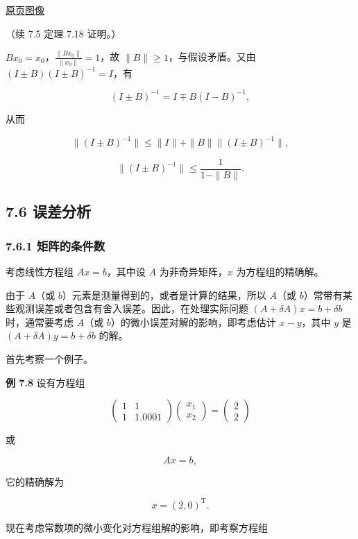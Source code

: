 \documentclass[
  10pt,
  fontset=fandol]{ctexart}
\begin{document}
\href{../../source-images/pdf-205.jpeg}{原页图像}

（续 7.5 定理 7.18 证明。）

\(Bx_0=x_0\)，\(\frac{\|Bx_0\|}{\|x_0\|}=1\)，故 \(\|B\|\geqslant1\)，与假设矛盾。又由 \((I\pm B)(I\pm B)^{-1}=I\)，有

\[
(I\pm B)^{-1}=I\mp B(I-B)^{-1},
\]

从而

\[
\|(I\pm B)^{-1}\|\leqslant\|I\|+\|B\|\|(I\pm B)^{-1}\|,
\]

\[
\|(I\pm B)^{-1}\|\leqslant\frac1{1-\|B\|}.
\]

\subsection{7.6 误差分析}\label{ux8befux5deeux5206ux6790}

\subsubsection{7.6.1 矩阵的条件数}\label{ux77e9ux9635ux7684ux6761ux4ef6ux6570}

考虑线性方程组 \(Ax=b\)，其中设 \(A\) 为非奇异矩阵，\(x\) 为方程组的精确解。

由于 \(A\)（或 \(b\)）元素是测量得到的，或者是计算的结果，所以 \(A\)（或 \(b\)）常带有某些观测误差或者包含有舍入误差。因此，在处理实际问题 \((A+\delta A)x=b+\delta b\) 时，通常要考虑 \(A\)（或 \(b\)）的微小误差对解的影响，即考虑估计 \(x-y\)，其中 \(y\) 是 \((A+\delta A)y=b+\delta b\) 的解。

首先考察一个例子。

\textbf{例 7.8} 设有方程组

\[
\begin{pmatrix}1&1\\1&1.0001\end{pmatrix}
\begin{pmatrix}x_1\\x_2\end{pmatrix}
=\begin{pmatrix}2\\2\end{pmatrix}
\]

或

\[
Ax=b,
\tag{7.6.1}
\]

它的精确解为

\[
x=(2,0)^{\mathrm T}.
\]

现在考虑常数项的微小变化对方程组解的影响，即考察方程组
\end{document}
